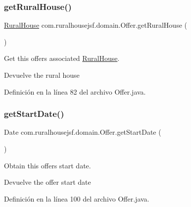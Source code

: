 \subsubsection{\texorpdfstring{getRuralHouse()}{getRuralHouse()}}
{\footnotesize\ttfamily \mbox{\hyperlink{classcom_1_1ruralhousejsf_1_1domain_1_1_rural_house}{Rural\+House}} com.\+ruralhousejsf.\+domain.\+Offer.\+get\+Rural\+House (\begin{DoxyParamCaption}{ }\end{DoxyParamCaption})}



Get this offers associated \mbox{\hyperlink{classcom_1_1ruralhousejsf_1_1domain_1_1_rural_house}{Rural\+House}}. 

\begin{DoxyReturn}{Devuelve}
the rural house 
\end{DoxyReturn}


Definición en la línea 82 del archivo Offer.\+java.

\mbox{\label{classcom_1_1ruralhousejsf_1_1domain_1_1_offer_a41039d86fd455568f6623996b639b7a5}} 
\subsubsection{\texorpdfstring{getStartDate()}{getStartDate()}}
{\footnotesize\ttfamily Date com.\+ruralhousejsf.\+domain.\+Offer.\+get\+Start\+Date (\begin{DoxyParamCaption}{ }\end{DoxyParamCaption})}



Obtain this offers start date. 

\begin{DoxyReturn}{Devuelve}
the offer start date 
\end{DoxyReturn}


Definición en la línea 100 del archivo Offer.\+java.

\mbox{\label{classcom_1_1ruralhousejsf_1_1domain_1_1_offer_aad4fd5441e084e41b30bb1d8d3597c48}} 
